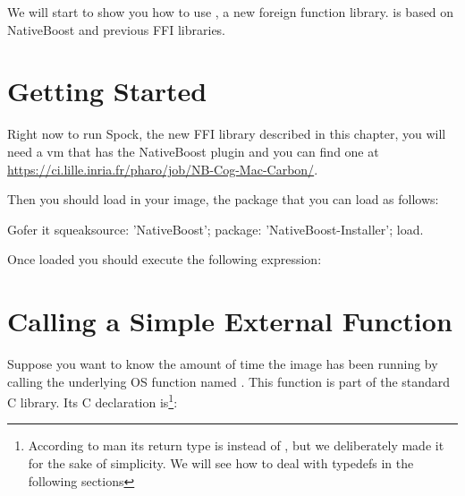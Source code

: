 \documentclass[a4paper,10pt,twoside]{book}
\begin{document}
We will start to show you how to use \Spock, a new foreign function library. \Spock is based on NativeBoost and previous FFI libraries.


\section{Getting Started}



Right now to run Spock, the new FFI library described in this chapter, you will need a vm that has the NativeBoost plugin and  you can find one at \url{https://ci.lille.inria.fr/pharo/job/NB-Cog-Mac-Carbon/}.  

Then you should load in your image, the package  that you can load as follows:
\begin{code}{}
Gofer it
        squeaksource: 'NativeBoost';
        package: 'NativeBoost-Installer';
        load.
\end{code}

Once loaded you should execute the following expression: 


%
%
%
%
%
%
%
% 
%


\section{Calling a Simple External Function}


Suppose you want to know the amount of time the image has been running by calling the underlying OS function named . 
This function is part of the standard C library. Its C declaration is\footnote{According to man its return type is  instead of , but we deliberately made it  for the sake of simplicity. We will see how to deal with typedefs in the following sections}:
\end{document}

